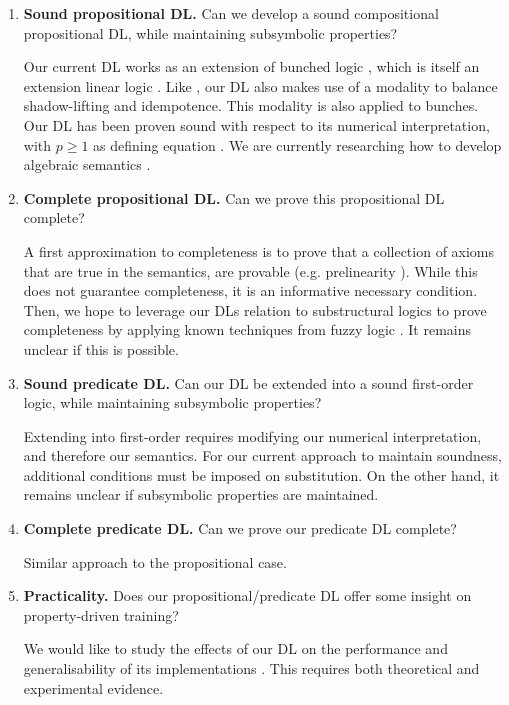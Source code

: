 \begin{enumerate}
    \item \textbf{Sound propositional DL.} Can we develop a sound compositional propositional DL, while maintaining subsymbolic properties? 
    
    Our current DL works as an extension of bunched logic \mcita{}, which is itself an extension linear logic \mcita{}.
    Like \mcita{}, our DL also makes use of a modality to balance shadow-lifting and idempotence. This modality is also applied to bunches. Our DL has been proven sound with respect to its numerical interpretation, with $p \geq 1$ as defining equation \mcita{}. We are currently researching how to develop algebraic semantics \mcita{}.
    
    \item \textbf{Complete propositional DL.} Can we prove this propositional DL complete?
    
    A first approximation to completeness is to prove that a collection of axioms that are true in the semantics, are provable (e.g. prelinearity \mcita{}). While this does not guarantee completeness, it is an informative necessary condition. Then, we hope to leverage our DLs relation to substructural logics to prove completeness by applying known techniques from fuzzy logic \mcita{}. It remains unclear if this is possible. 
    \item \textbf{Sound predicate DL.} Can our DL be extended into a sound first-order logic, while maintaining subsymbolic properties?

    Extending into first-order requires modifying our numerical interpretation, and therefore our semantics. For our current approach to maintain soundness, additional conditions must be imposed on substitution. On the other hand, it remains unclear if subsymbolic properties are maintained. 
    
    \item \textbf{Complete predicate DL.} Can we prove our predicate DL complete?
    
    Similar approach to the propositional case. 
    
    \item \textbf{Practicality.} Does our propositional/predicate DL offer some insight on property-driven training?

    We would like to study the effects of our DL on the performance and generalisability of its implementations \mcita{}. This requires both theoretical and experimental evidence. 
    
\end{enumerate}
